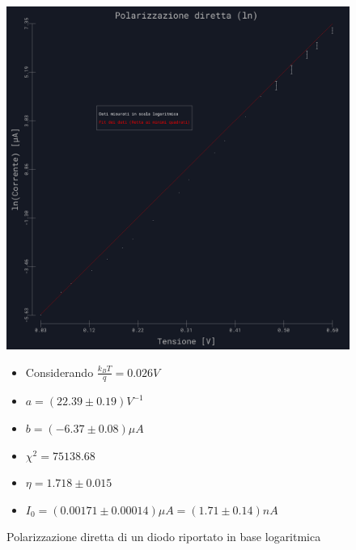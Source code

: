 \documentclass{article}
\begin{document}
\begin{figure}[h]
    \begin{minipage}{0.69\textwidth} %
        \centering
        \includegraphics[width=1\linewidth]{../images/grafico3.png} %
        \caption{Polarizzazione diretta di un diodo riportato in base logaritmica}
        \label{grafico:3}
    \end{minipage}
    \hfill %
    \begin{minipage}{0.3\textwidth}    
    \begin{itemize}
        \item Considerando $\frac{k_BT}{q} = 0.026V$
        \item $a=(22.39 \pm 0.19 )V^{-1}$
        \item $b=(-6.37 \pm 0.08)\mu A$
        \item $\chi^2 = 75138.68$
        \item $\eta=1.718 \pm 0.015$
        \item $I_0= (0.00171 \pm 0.00014) \mu A = (1.71 \pm 0.14) nA$
    \end{itemize}
    \end{minipage}
\end{figure}
\end{document}
